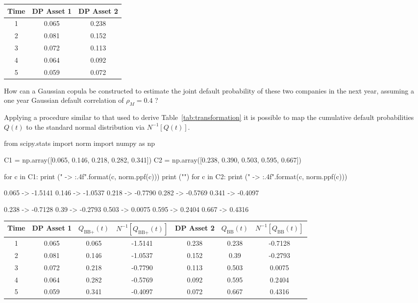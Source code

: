 \begin{table}[htbp]
\centering
\begin{tabular}{|c|c|c|}
\hline
Time & DP Asset 1 & DP Asset 2 \\
\hline
\hline
1 & 0.065 & 0.238 \\
2 & 0.081 & 0.152 \\
3 & 0.072 & 0.113 \\
4 & 0.064 & 0.092 \\
5 & 0.059 & 0.072 \\
\hline
\end{tabular}
\end{table}

How can a Gaussian copula be constructed to estimate the joint default probability of these two companies in the next year, assuming a one year Gaussian default correlation of $\rho_M = 0.4$ ?

Applying a procedure similar to that used to derive Table~\ref{tab:transformation} it is possible to map the cumulative default probabilities $Q(t)$ to the standard normal distribution via $N^{-1}[Q(t)]$.

\begin{ipython}
from scipy.stats import norm
import numpy as np

C1 = np.array([0.065, 0.146, 0.218, 0.282, 0.341])
C2 = np.array([0.238, 0.390, 0.503, 0.595, 0.667])

for c in C1:
    print ("{} -> {:.4f}".format(c, norm.ppf(c)))
print ("")
for c in C2:
    print ("{} -> {:.4f}".format(c, norm.ppf(c)))
\end{ipython}
\begin{ioutput}
0.065 -> -1.5141
0.146 -> -1.0537
0.218 -> -0.7790
0.282 -> -0.5769
0.341 -> -0.4097

0.238 -> -0.7128
0.39 -> -0.2793
0.503 -> 0.0075
0.595 -> 0.2404
0.667 -> 0.4316
\end{ioutput}

\begin{table}[htbp]
\centering
\begin{tabular}{|c|c|c|c|c|c|c|}
\hline
Time & DP Asset 1 & $Q_{\textrm{BB+}}(t)$ & $N^{-1}[Q_{\textrm{BB+}}(t)]$ & DP Asset 2 & $Q_{\textrm{BB}}(t)$ & $N^{-1}[Q_{\textrm{BB}}(t)]$\\
\hline
\hline
1 & 0.065 & 0.065 & -1.5141 & 0.238 & 0.238 & -0.7128\\
2 & 0.081 & 0.146 & -1.0537 & 0.152 & 0.39 & -0.2793\\
3 & 0.072 & 0.218 & -0.7790 & 0.113 & 0.503 & 0.0075\\
4 & 0.064 & 0.282 & -0.5769 & 0.092 & 0.595 & 0.2404\\
5 & 0.059 & 0.341 & -0.4097 & 0.072 & 0.667 & 0.4316\\
\hline
\end{tabular}
\end{table}

